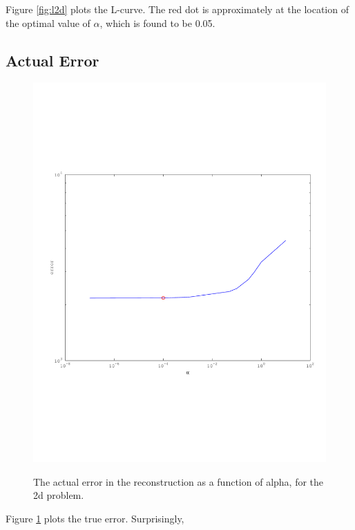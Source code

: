 \documentclass{article}
\begin{document}
Figure \ref{fig:l2d} plots the L-curve. The red dot is approximately at
the location of the optimal value of $\alpha$, which is found to be 0.05. 

\subsection{Actual Error}

\begin{figure}[!htb]
  \includegraphics[scale=.5]{plots/2d-true.pdf}
  \label{fig:2dt}
  \caption{The actual error in the reconstruction as a function of
 alpha, for the 2d problem.} 
\end{figure}

Figure \ref{fig:2dt} plots the true error. Surprisingly, 
\end{document}
